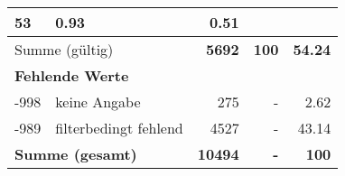 \begin{longtable}{lXrrr}
       \num{53} &
       \num[round-mode=places,round-precision=2]{0.93} &
         \num[round-mode=places,round-precision=2]{0.51} \\
     \midrule
     \multicolumn{2}{l}{Summe (gültig)} &
       \textbf{\num{5692}} &
     \textbf{\num{100}} &
       \textbf{\num[round-mode=places,round-precision=2]{54.24}} \\
     \multicolumn{5}{l}{\textbf{Fehlende Werte}}\\
       -998 &
       keine Angabe &
         \num{275} &
        - &
         \num[round-mode=places,round-precision=2]{2.62} \\
       -989 &
       filterbedingt fehlend &
         \num{4527} &
        - &
         \num[round-mode=places,round-precision=2]{43.14} \\
     \midrule
     \multicolumn{2}{l}{\textbf{Summe (gesamt)}} &
          \textbf{\num{10494}} &
        \textbf{-} &
        \textbf{\num{100}} \\
     \bottomrule
     \end{longtable}
     
